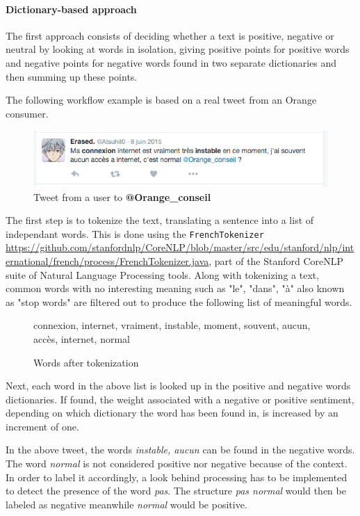 \documentclass[11pt]{article}
\begin{document}
\paragraph{Dictionary-based approach}

The first approach consists of deciding whether a text is positive, negative or neutral by looking at words in isolation, giving positive points for positive words and negative points for negative words found in two separate dictionaries and then summing up these points.

The following workflow example is based on a real tweet from an Orange consumer.

\begin{figure}[h!]
    \centering
    \includegraphics[scale=0.6]{img/tweet1.png}
    \caption{Tweet from a user to \textbf{@Orange\_conseil}}
    \label{tweet1}
\end{figure}

The first step is to tokenize the text, translating a sentence into a list of independant words. This is done using the \texttt{FrenchTokenizer} \url{https://github.com/stanfordnlp/CoreNLP/blob/master/src/edu/stanford/nlp/international/french/process/FrenchTokenizer.java}, part of the Stanford CoreNLP suite of Natural Language Processing tools. Along with tokenizing a text, common words with no interesting meaning such as "le", "dans", "à" also known as "stop words" are filtered out to produce the following list of meaningful words.

\begin{figure}[h!]
    \centering
    connexion, internet, vraiment, instable, moment, souvent, aucun, accès, internet, normal
    \caption{Words after tokenization}
    \label{tokens}
\end{figure}

Next, each word in the above list is looked up in the positive and negative words dictionaries. If found, the weight associated with a negative or positive sentiment, depending on which dictionary the word has been found in, is increased by an increment of one.

In the above tweet, the words \textit{instable, aucun} can be found in the negative words. The word \textit{normal} is not considered positive nor negative because of the context. In order to label it accordingly, a look behind processing has to be implemented to detect the presence of the word \textit{pas}. The structure \textit{pas normal} would then be labeled as negative meanwhile \textit{normal} would be positive.
\end{document}
